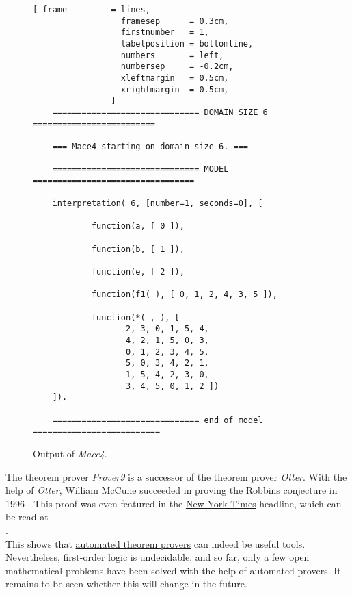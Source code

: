 \begin{figure}[!ht]
\centering
\begin{Verbatim}[ frame         = lines, 
                  framesep      = 0.3cm, 
                  firstnumber   = 1,
                  labelposition = bottomline,
                  numbers       = left,
                  numbersep     = -0.2cm,
                  xleftmargin   = 0.5cm,
                  xrightmargin  = 0.5cm,
                ]
    ============================== DOMAIN SIZE 6 =========================
    
    === Mace4 starting on domain size 6. ===
    
    ============================== MODEL =================================
    
    interpretation( 6, [number=1, seconds=0], [
    
            function(a, [ 0 ]),
    
            function(b, [ 1 ]),
    
            function(e, [ 2 ]),
    
            function(f1(_), [ 0, 1, 2, 4, 3, 5 ]),
    
            function(*(_,_), [
    			   2, 3, 0, 1, 5, 4,
    			   4, 2, 1, 5, 0, 3,
    			   0, 1, 2, 3, 4, 5,
    			   5, 0, 3, 4, 2, 1,
    			   1, 5, 4, 2, 3, 0,
    			   3, 4, 5, 0, 1, 2 ])
    ]).
    
    ============================== end of model ==========================
\end{Verbatim}
\vspace*{-0.3cm}
\caption{Output of \textsl{Mace4}.}
\label{fig:group.out}
\end{figure}

\remarkEng
The theorem prover \textsl{Prover9} is a successor of the theorem prover \textsl{Otter}. With the help of
\textsl{Otter}, William McCune succeeded in proving the Robbins conjecture in 1996 \cite{mccune:1997}. This
proof was even featured in the \href{http://www.nytimes.com/}{New York Times} headline, which can be read at 
\\[0.2cm]
\hspace*{1.3cm}
\href{http://www.nytimes.com/library/cyber/week/1210math.html}{}.
\\[0.2cm]
This shows that \href{https://en.wikipedia.org/wiki/Automated_theorem_proving}{automated theorem provers} can
indeed be useful tools. Nevertheless, first-order logic is undecidable, and so far, only a few open
mathematical problems have been solved with the help of automated provers.  It remains to be seen whether this
will change in the future.
\eox



